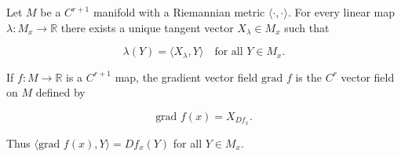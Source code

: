 Let $M$ be a $C^{r+1}$ manifold with a Riemannian metric $\langle\cdot,\cdot\rangle$. For every linear map $\lambda: M_x \to \mathbb{R}$ there exists a unique tangent vector $X_\lambda \in M_x$ such that

$$\lambda(Y) = \langle X_\lambda, Y \rangle \quad \text{for all } Y \in M_x.$$

If $f: M \to \mathbb{R}$ is a $C^{r+1}$ map, the gradient vector field $\text{grad } f$ is the $C^r$ vector field on $M$ defined by

$$\text{grad } f(x) = X_{Df_x}.$$

Thus $\langle \text{grad } f(x), Y \rangle = Df_x(Y)$ for all $Y \in M_x$.
